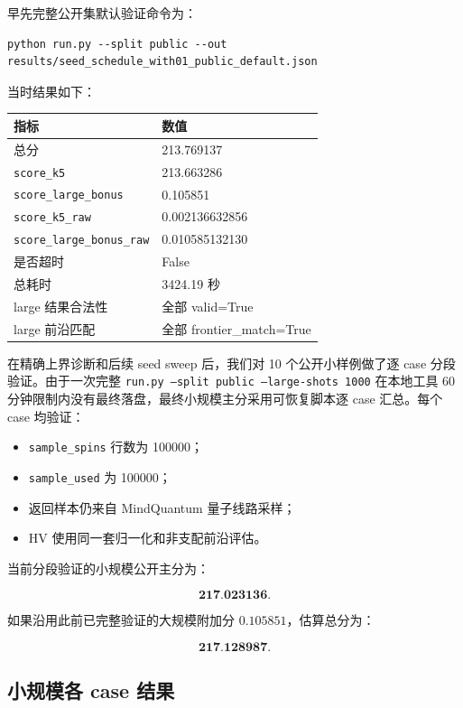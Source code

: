 \documentclass[UTF8,zihao=-4]{ctexart}
\newcommand{\code}[1]{\texttt{#1}}
\begin{document}
早先完整公开集默认验证命令为：

\begin{lstlisting}
python run.py --split public --out results/seed_schedule_with01_public_default.json
\end{lstlisting}

当时结果如下：

\begin{center}
\begin{tabular}{ll}
\toprule
指标 & 数值 \\
\midrule
总分 & 213.769137 \\
\code{score\_k5} & 213.663286 \\
\code{score\_large\_bonus} & 0.105851 \\
\code{score\_k5\_raw} & 0.002136632856 \\
\code{score\_large\_bonus\_raw} & 0.010585132130 \\
是否超时 & False \\
总耗时 & 3424.19 秒 \\
large 结果合法性 & 全部 valid=True \\
large 前沿匹配 & 全部 frontier\_match=True \\
\bottomrule
\end{tabular}
\end{center}

在精确上界诊断和后续 seed sweep 后，我们对 10 个公开小样例做了逐 case 分段验证。由于一次完整 \code{run.py --split public --large-shots 1000} 在本地工具 60 分钟限制内没有最终落盘，最终小规模主分采用可恢复脚本逐 case 汇总。每个 case 均验证：

\begin{itemize}
  \item \code{sample\_spins} 行数为 100000；
  \item \code{sample\_used} 为 100000；
  \item 返回样本仍来自 MindQuantum 量子线路采样；
  \item HV 使用同一套归一化和非支配前沿评估。
\end{itemize}

当前分段验证的小规模公开主分为：

\[
\textbf{217.023136}.
\]

如果沿用此前已完整验证的大规模附加分 \(0.105851\)，估算总分为：

\[
\textbf{217.128987}.
\]

\subsection{小规模各 case 结果}
\end{document}
